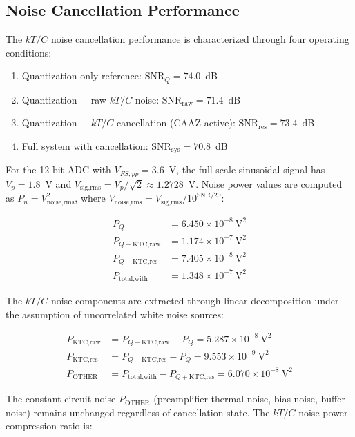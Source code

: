 \documentclass[journal]{IEEEtran}
\begin{document}
\subsection{Noise Cancellation Performance}

The $kT/C$ noise cancellation performance is characterized through four operating conditions:
\begin{enumerate}
    \item Quantization-only reference: $\text{SNR}_Q = 74.0$~dB
    \item Quantization $+$ raw $kT/C$ noise: $\text{SNR}_{\text{raw}} = 71.4$~dB
    \item Quantization $+$ $kT/C$ cancellation (CAAZ active): $\text{SNR}_{\text{res}} = 73.4$~dB
    \item Full system with cancellation: $\text{SNR}_{\text{sys}} = 70.8$~dB
\end{enumerate}

For the 12-bit ADC with $V_{FS,pp} = 3.6$~V, the full-scale sinusoidal signal has $V_p = 1.8$~V and $V_{\text{sig,rms}} = V_p/\sqrt{2} \approx 1.2728$~V. Noise power values are computed as $P_n = V_{\text{noise,rms}}^2$, where $V_{\text{noise,rms}} = V_{\text{sig,rms}} / 10^{\text{SNR}/20}$:

\begin{align}
P_Q &= 6.450 \times 10^{-8}~\text{V}^2 \\
P_{Q+\text{KTC,raw}} &= 1.174 \times 10^{-7}~\text{V}^2 \\
P_{Q+\text{KTC,res}} &= 7.405 \times 10^{-8}~\text{V}^2 \\
P_{\text{total,with}} &= 1.348 \times 10^{-7}~\text{V}^2
\end{align}

The $kT/C$ noise components are extracted through linear decomposition under the assumption of uncorrelated white noise sources:

\begin{align}
P_{\text{KTC,raw}} &= P_{Q+\text{KTC,raw}} - P_Q = 5.287 \times 10^{-8}~\text{V}^2 \\
P_{\text{KTC,res}} &= P_{Q+\text{KTC,res}} - P_Q = 9.553 \times 10^{-9}~\text{V}^2 \\
P_{\text{OTHER}} &= P_{\text{total,with}} - P_{Q+\text{KTC,res}} = 6.070 \times 10^{-8}~\text{V}^2
\end{align}

The constant circuit noise $P_{\text{OTHER}}$ (preamplifier thermal noise, bias noise, buffer noise) remains unchanged regardless of cancellation state. The $kT/C$ noise power compression ratio is:
\end{document}
